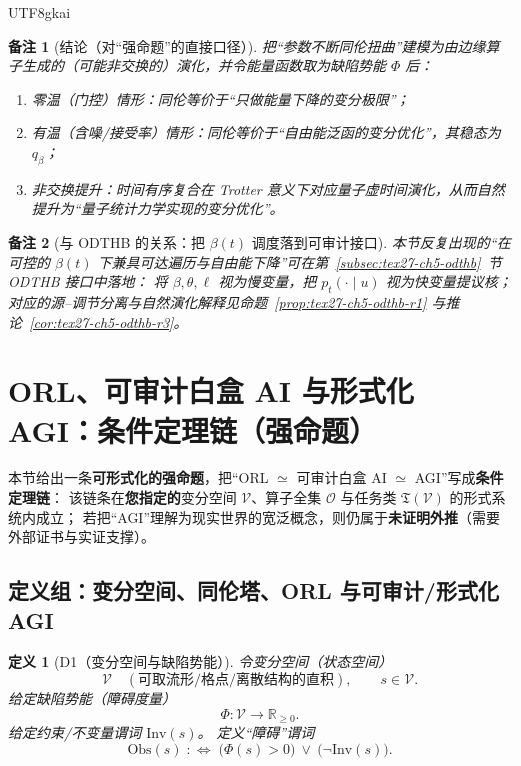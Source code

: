 \documentclass[12pt]{article}
\newtheorem{definition}{定义}[section]
\newtheorem{remark}{备注}[section]
\newcommand{\RR}{\mathbb{R}}
\begin{document}
\begin{CJK*}{UTF8}{gkai}
\begin{remark}[结论（对“强命题”的直接口径）]
\label{rem:tex27-ch8-r2}
把“参数不断同伦扭曲”建模为由边缘算子生成的（可能非交换的）演化，并令能量函数取为缺陷势能 $\Phi$ 后：
\begin{enumerate}
  \item 零温（门控）情形：同伦等价于“只做能量下降的变分极限”；
  \item 有温（含噪/接受率）情形：同伦等价于“自由能泛函的变分优化”，其稳态为 $q_\beta$；
  \item 非交换提升：时间有序复合在 Trotter 意义下对应量子虚时间演化，从而自然提升为“量子统计力学实现的变分优化”。
\end{enumerate}
\end{remark}

\begin{remark}[与 ODTHB 的关系：把 $\beta(t)$ 调度落到可审计接口]
本节反复出现的“在可控的 $\beta(t)$ 下兼具可达遍历与自由能下降”可在第~\ref{subsec:tex27-ch5-odthb}~节 ODTHB 接口中落地：
将 $\beta,\theta,\ell$ 视为慢变量，把 $p_t(\cdot\mid u)$ 视为快变量提议核；
对应的源--调节分离与自然演化解释见命题~\ref{prop:tex27-ch5-odthb-r1} 与推论~\ref{cor:tex27-ch5-odthb-r3}。
\end{remark}

\section{ORL、可审计白盒 AI 与形式化 AGI：条件定理链（强命题）}
\label{sec:tex27-ch9-orl-whitebox-agi}

本节给出一条\textbf{可形式化的强命题}，把“ORL $\simeq$ 可审计白盒 AI $\simeq$ AGI”写成\textbf{条件定理链}：
该链条在\textbf{您指定的}变分空间 $\mathcal{V}$、算子全集 $\mathcal{O}$ 与任务类 $\mathfrak{T}(\mathcal{V})$ 的形式系统内成立；
若把“AGI”理解为现实世界的宽泛概念，则仍属于\textbf{未证明外推}（需要外部证书与实证支撑）。

\subsection{定义组：变分空间、同伦塔、ORL 与可审计/形式化 AGI}
\label{subsec:tex27-ch9-defs}

\begin{definition}[D1（变分空间与缺陷势能）]
\label{def:tex27-ch9-d1}
令变分空间（状态空间）
\[
  \mathcal{V}\quad(\text{可取流形/格点/离散结构的直积}),
  \qquad
  s\in\mathcal{V}.
\]
给定缺陷势能（障碍度量）
\[
  \Phi:\mathcal{V}\to \RR_{\ge 0}.
\]
给定约束/不变量谓词 $\mathrm{Inv}(s)$。
定义“障碍”谓词
\[
  \mathrm{Obs}(s)\;:\!\iff\;\bigl(\Phi(s)>0\bigr)\ \vee\ \bigl(\neg \mathrm{Inv}(s)\bigr).
\]
\end{definition}


\end{CJK*}
\end{document}

